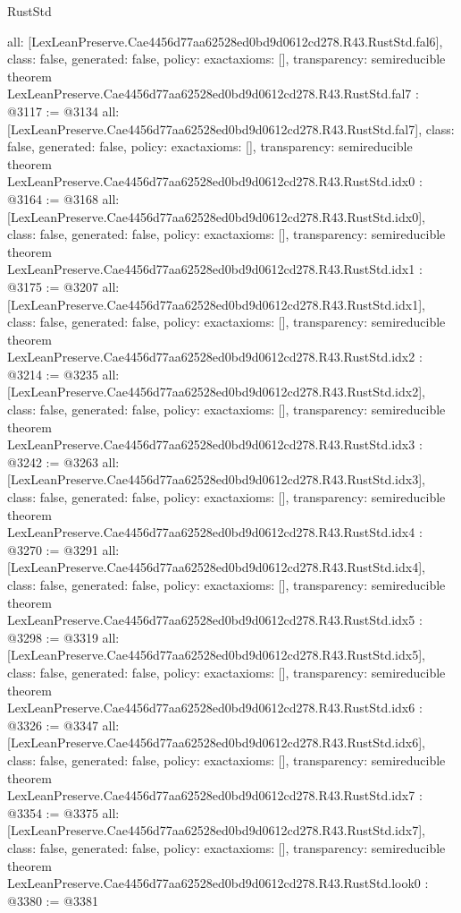\begin{lexlean}{RustStd}
\begin{coremodule}
{  all: [LexLeanPreserve.Cae4456d77aa62528ed0bd9d0612cd278.R43.RustStd.fal6],
  class: false,
  generated: false,
  policy: exact{axioms: []},
  transparency: semireducible
}
theorem LexLeanPreserve.Cae4456d77aa62528ed0bd9d0612cd278.R43.RustStd.fal7 : @3117 := @3134 {
  all: [LexLeanPreserve.Cae4456d77aa62528ed0bd9d0612cd278.R43.RustStd.fal7],
  class: false,
  generated: false,
  policy: exact{axioms: []},
  transparency: semireducible
}
theorem LexLeanPreserve.Cae4456d77aa62528ed0bd9d0612cd278.R43.RustStd.idx0 : @3164 := @3168 {
  all: [LexLeanPreserve.Cae4456d77aa62528ed0bd9d0612cd278.R43.RustStd.idx0],
  class: false,
  generated: false,
  policy: exact{axioms: []},
  transparency: semireducible
}
theorem LexLeanPreserve.Cae4456d77aa62528ed0bd9d0612cd278.R43.RustStd.idx1 : @3175 := @3207 {
  all: [LexLeanPreserve.Cae4456d77aa62528ed0bd9d0612cd278.R43.RustStd.idx1],
  class: false,
  generated: false,
  policy: exact{axioms: []},
  transparency: semireducible
}
theorem LexLeanPreserve.Cae4456d77aa62528ed0bd9d0612cd278.R43.RustStd.idx2 : @3214 := @3235 {
  all: [LexLeanPreserve.Cae4456d77aa62528ed0bd9d0612cd278.R43.RustStd.idx2],
  class: false,
  generated: false,
  policy: exact{axioms: []},
  transparency: semireducible
}
theorem LexLeanPreserve.Cae4456d77aa62528ed0bd9d0612cd278.R43.RustStd.idx3 : @3242 := @3263 {
  all: [LexLeanPreserve.Cae4456d77aa62528ed0bd9d0612cd278.R43.RustStd.idx3],
  class: false,
  generated: false,
  policy: exact{axioms: []},
  transparency: semireducible
}
theorem LexLeanPreserve.Cae4456d77aa62528ed0bd9d0612cd278.R43.RustStd.idx4 : @3270 := @3291 {
  all: [LexLeanPreserve.Cae4456d77aa62528ed0bd9d0612cd278.R43.RustStd.idx4],
  class: false,
  generated: false,
  policy: exact{axioms: []},
  transparency: semireducible
}
theorem LexLeanPreserve.Cae4456d77aa62528ed0bd9d0612cd278.R43.RustStd.idx5 : @3298 := @3319 {
  all: [LexLeanPreserve.Cae4456d77aa62528ed0bd9d0612cd278.R43.RustStd.idx5],
  class: false,
  generated: false,
  policy: exact{axioms: []},
  transparency: semireducible
}
theorem LexLeanPreserve.Cae4456d77aa62528ed0bd9d0612cd278.R43.RustStd.idx6 : @3326 := @3347 {
  all: [LexLeanPreserve.Cae4456d77aa62528ed0bd9d0612cd278.R43.RustStd.idx6],
  class: false,
  generated: false,
  policy: exact{axioms: []},
  transparency: semireducible
}
theorem LexLeanPreserve.Cae4456d77aa62528ed0bd9d0612cd278.R43.RustStd.idx7 : @3354 := @3375 {
  all: [LexLeanPreserve.Cae4456d77aa62528ed0bd9d0612cd278.R43.RustStd.idx7],
  class: false,
  generated: false,
  policy: exact{axioms: []},
  transparency: semireducible
}
theorem LexLeanPreserve.Cae4456d77aa62528ed0bd9d0612cd278.R43.RustStd.look0 : @3380 := @3381 {
}
\end{coremodule}
\end{lexlean}
